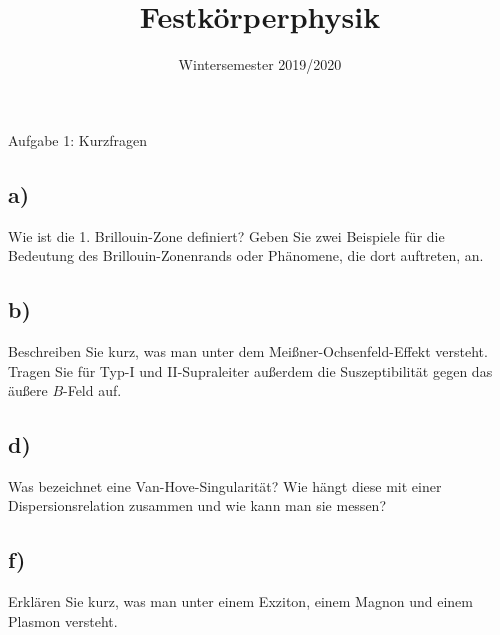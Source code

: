 

\subject{FKP}
\title{Festkörperphysik}
\date{
    Wintersemester 2019/2020
}



\maketitle
\thispagestyle{empty}
\newpage


\begin{aufgabe}{Aufgabe 1: Kurzfragen}
    \subsection{a)}
    Wie ist die 1. Brillouin-Zone definiert?
    Geben Sie zwei Beispiele für die Bedeutung des Brillouin-Zonenrands oder Phänomene, die dort auftreten, an.

    \subsection{b)}
    Beschreiben Sie kurz, was man unter dem Meißner-Ochsenfeld-Effekt versteht.
    Tragen Sie für Typ-I und II-Supraleiter außerdem die Suszeptibilität gegen das äußere $B$-Feld auf.


    \subsection{d)}
    Was bezeichnet eine Van-Hove-Singularität?
    Wie hängt diese mit einer Dispersionsrelation zusammen und wie kann man sie messen?


    \subsection{f)}
    Erklären Sie kurz, was man unter einem Exziton, einem Magnon und einem Plasmon versteht.
\end{aufgabe}

